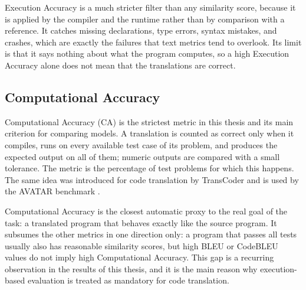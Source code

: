 Execution Accuracy is a much stricter filter than any similarity score,
because it is applied by the compiler and the runtime rather than by
comparison with a reference. It catches missing declarations, type errors,
syntax mistakes, and crashes, which are exactly the failures that text metrics
tend to overlook. Its limit is that it says nothing about what the program
computes, so a high Execution Accuracy alone does not mean that the
translations are correct.

\subsection{Computational Accuracy}

\quad Computational Accuracy (CA) is the strictest metric in this thesis and
its main criterion for comparing models. A translation is counted as correct
only when it compiles, runs on every available test case of its problem, and
produces the expected output on all of them; numeric outputs are compared with
a small tolerance. The metric is the percentage of test problems for which
this happens. The same idea was introduced for code translation by TransCoder
\cite{roziere2020transcoder} and is used by the AVATAR benchmark
\cite{ahmad2023avatar}.

Computational Accuracy is the closest automatic proxy to the real goal of the
task: a translated program that behaves exactly like the source program. It
subsumes the other metrics in one direction only: a program that passes all
tests usually also has reasonable similarity scores, but high BLEU or CodeBLEU
values do not imply high Computational Accuracy. This gap is a recurring
observation in the results of this thesis, and it is the main reason why
execution-based evaluation is treated as mandatory for code translation.
